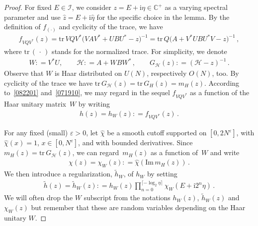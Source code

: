 \documentclass[10pt,reqno]{amsart}
\numberwithin{equation}{section}
\theoremstyle{plain}
\numberwithin{kevin}{section}
\theoremstyle{remark}
\renewcommand{\Im}{\mathrm{Im}\,}
\newcommand{\C}{{\mathbb C}}
\newcommand{\ii}{\mathrm{i}}
\newcommand{\deq}{\mathrel{\mathop:}=}
\newcommand{\ntr}{\mathrm{tr}\,}
\begin{document}
\begin{proof} For fixed $E\in \mathcal{I}$, we consider $z=E+\ii\eta\in\C^+$ as a varying spectral parameter and use $\widehat{z}=E+\ii\widehat{\eta}$ for the specific choice in the lemma. By the definition of $f_{(\cdot)}$ and cyclicity of the trace, we have
\begin{align}
f_{VQV^*}(z)=\ntr VQV^*\big(VAV^*+UBU^*-z\big)^{-1}= \ntr Q\big(A+V^*UBU^*V-z\big)^{-1}\,, \label{082201}
\end{align}
where $\ntr(\,\cdot\,)$ stands for the normalized trace. For simplicity, we denote
\begin{align}
W\deq V^*U,\qquad \mathcal{H}\deq A+WBW^*\,, \qquad G_{\mathcal{H}}(z)\deq(\mathcal{H}-z)^{-1}\,. \label{071910}
\end{align}
Observe that $W$ is Haar distributed on $U(N)$, respectively $O(N)$, too. By cyclicity of the trace we have $\ntr G_\mathcal{H}(z)=\ntr G_H(z)=m_H(z)$.
According to~\eqref{082201} and~\eqref{071910}, we may regard in the sequel $f_{VQV^*}$ as a function of the Haar unitary matrix~$W$ by writing
 \begin{align*}
 h(z)=h_W(z)  \deq f_{VQV^*}(z)\,.
 \end{align*}
 
For any fixed (small) $\varepsilon>0$, let $\widehat\chi$ be a smooth cutoff supported on $[0,2N^{\varepsilon}]$, with $\widehat\chi(x)=1$, $x\in [0,N^{\varepsilon}]$, and with bounded derivatives. Since $m_H(z)=\ntr G_\mathcal{H}(z)$, we can regard~$m_H(z)$ as a function of~$W$ and write
\begin{align}\label{070110}
\chi(z)= \chi_W(z)\deq\widehat\chi(\Im m_H(z))\,.
\end{align}
We then introduce a regularization, $\widetilde{h}_W$, of $h_W$ by setting
\begin{align}
\widetilde{h}(z)=\widetilde{h}_{W}(z)\deq h_{W}(z)\prod_{n=0}^{\lceil -\log_2 \eta\rceil} \chi_W(E+\ii2^{n}\eta)\,.  \label{041820}
\end{align}
We will often drop the $W$ subscript from the notations $h_W(z)$, $\widetilde{h}_{W}(z)$
 and $\chi_W(z)$ but remember that these
are random variables depending on the Haar unitary $W$.


\end{proof}
\end{document}
